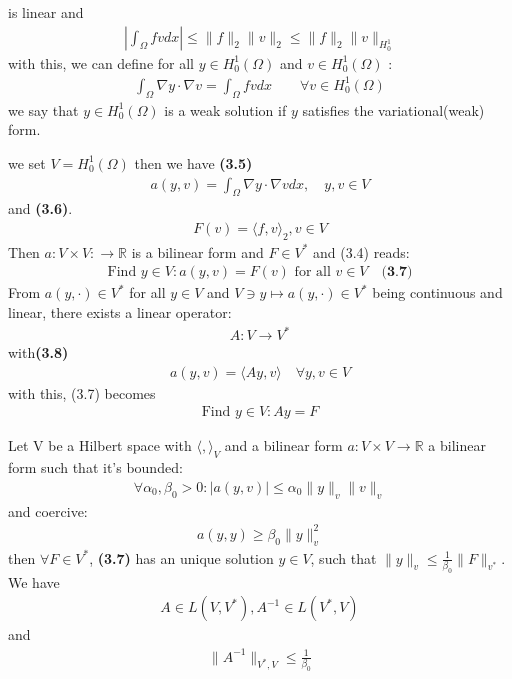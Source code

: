is linear and 
\begin{align*}
	|\int_\Omega fv dx | \le \|f\|_2 \|v\|_2 \le \|f\|_2 \|v\|_{H^1_0}
\end{align*}
with this, we can define for all $y \in H^1_0(\Omega)$ and $v \in H^1_0(\Omega)$ :
\begin{align*}
	\int_\Omega \nabla y \cdot \nabla v = \int_\Omega fv dx \qquad \forall v \in H_0^1(\Omega)
\end{align*}
we say that $y \in H^1_0(\Omega)$ is a weak solution if $y$ satisfies the variational(weak) form. \par
we set $V = H^1_0(\Omega)$ then we have \textbf{(3.5)}
\begin{align*}
	a(y, v) = \int_\Omega \nabla y \cdot \nabla v dx , \quad y, v \in V
\end{align*}
and\textbf{ (3.6)}.
\begin{align*}
	F(v) = \langle f, v \rangle_2, v \in V
\end{align*}
Then $a: V \times V: \rightarrow \mathbb{R}$ is a bilinear form and $F \in V^*$ and (3.4) reads: 
\begin{align*}
	\text{Find } y \in V: a(y, v) = F(v) \text{ for all } v \in V
	\quad \textbf{(3.7)}
\end{align*}
From $a(y, \cdot) \in V^*$ for all $y \in V$ and  $V \ni y \mapsto a(y, \cdot) \in V^*$ being continuous and linear, there exists a linear operator:
\begin{align*}
	A: V \rightarrow V^*
\end{align*}
with\textbf{(3.8)}
\begin{align*}
	a(y, v) = \langle Ay, v \rangle \quad \forall y, v \in V
\end{align*}
with this, (3.7) becomes 
\begin{align*}
	\text{Find } y \in V: Ay = F
\end{align*}

\begin{theorem}
	Let V be a Hilbert space with $\langle, \rangle_V$ and a bilinear form $a: V \times V \rightarrow \mathbb{R}$ a bilinear form such that it's bounded:
	\begin{align*}
		\forall \alpha_0, \beta_0> 0: |a(y, v)| \le \alpha_0 \|y\|_v \|v\|_v
	\end{align*}
	and coercive:
	\begin{align*}
		a(y, y) \geq \beta_0\|y\|_v^2
	\end{align*}
	then $\forall F \in V^*$, \textbf{(3.7)  }has an unique solution $y \in V$, such that $\|y\|_v \le \frac{1}{\beta_0}\|F\|_{v^*}$. We have
	\begin{align*}
		A \in L(V, V^*), A^{-1} \in L(V^*, V)
	\end{align*}
	and 
	\begin{align*}
		\|A^{-1}\|_{V^*, V} \le \frac{1}{\beta_0}
	\end{align*}
\end{theorem}

